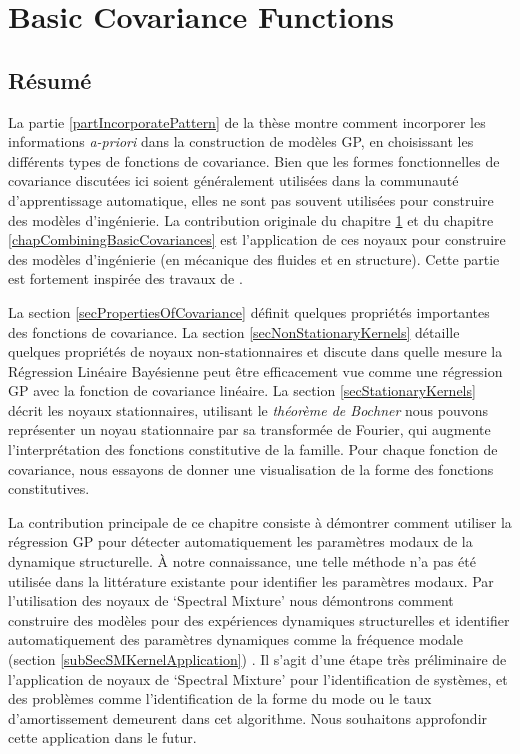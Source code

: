 \chapter{Basic Covariance Functions}
\label{chapBasicCovarianceKernels}

\begin{mdframed}[hidealllines=true,backgroundcolor=lightgray!20]
\section*{Résumé}
La partie \ref{partIncorporatePattern} de la thèse montre comment incorporer les informations \textit{a-priori} dans la construction de modèles GP, en choisissant les différents types de fonctions de covariance. Bien que les formes fonctionnelles de covariance discutées ici soient généralement utilisées dans la communauté d'apprentissage automatique, elles ne sont pas souvent utilisées pour construire des modèles d'ingénierie. La contribution originale du chapitre \ref{chapBasicCovarianceKernels} et du chapitre \ref{chapCombiningBasicCovariances} est l'application de ces noyaux pour construire des modèles d'ingénierie (en mécanique des fluides et en structure). Cette partie est fortement inspirée des travaux de \cite{duvenaud-thesis-2014, wilson2014thesis, lloyd2014automatic, durrande2001etude}.

La section \ref{secPropertiesOfCovariance} définit quelques propriétés importantes des fonctions de covariance. La section \ref{secNonStationaryKernels}  détaille quelques propriétés de noyaux non-stationnaires et discute dans quelle mesure la Régression Linéaire Bayésienne peut être efficacement vue comme une régression GP avec la fonction de covariance linéaire. La section \ref{secStationaryKernels} décrit les noyaux stationnaires, utilisant le \textit{théorème de Bochner} nous pouvons représenter un noyau stationnaire par sa transformée de Fourier, qui augmente l'interprétation des fonctions constitutive de la famille. Pour chaque fonction de covariance, nous essayons de donner une visualisation de la forme des fonctions constitutives. 

La contribution principale de ce chapitre consiste à démontrer comment utiliser la régression GP pour détecter automatiquement les paramètres modaux de la dynamique structurelle. À notre connaissance, une telle méthode n'a pas été utilisée dans la littérature existante pour identifier les paramètres modaux. Par l'utilisation des noyaux de `Spectral Mixture’ nous démontrons comment construire des modèles pour des expériences dynamiques structurelles et identifier automatiquement des paramètres dynamiques comme la fréquence modale (section \ref{subSecSMKernelApplication}) \cite{chiplunkar2017operational}. Il s'agit d'une étape très préliminaire de l'application de noyaux de `Spectral Mixture’ pour l'identification de systèmes, et des problèmes comme l'identification de la forme du mode ou le taux d'amortissement demeurent dans cet algorithme. Nous souhaitons approfondir cette application dans le futur.

\end{mdframed}


